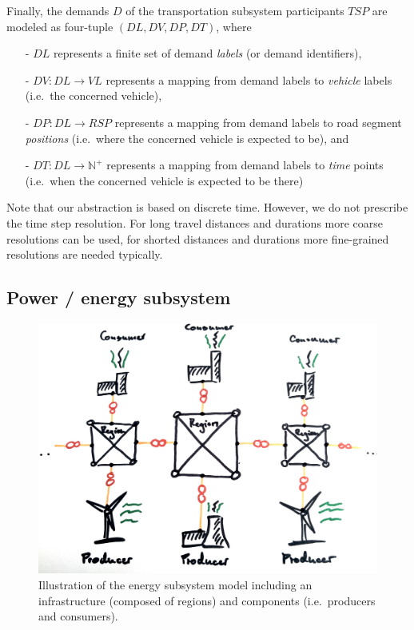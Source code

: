 Finally, the demands $D$ of the transportation subsystem participants $TSP$ are modeled as four-tuple $(DL, DV, DP, DT)$, where
\begin{itemize}
	\item[-] $DL$ represents a finite set of demand \textit{labels} (or demand identifiers),
	\item[-] $DV: DL \rightarrow VL$ represents a mapping from demand labels to \textit{vehicle} labels (i.e.\ the concerned vehicle),
	\item[-] $DP: DL \rightarrow RSP$ represents a mapping from demand labels to road segment \textit{positions} (i.e.\ where the concerned vehicle is expected to be), and
	\item[-] $DT: DL \rightarrow \mathbb{N}^+$ represents a mapping from demand labels to \textit{time} points (i.e.\ when the concerned vehicle is expected to be there)
\end{itemize}
Note that our abstraction is based on discrete time. However, we do not prescribe the time step resolution. For long travel distances and durations more coarse resolutions can be used, for shorted distances and durations more fine-grained resolutions are needed typically.

\subsection{Power / energy subsystem}
\label{energy_system}

\begin{figure}[h]
	\includegraphics[width=\columnwidth]{./gfx/energy_system.jpg}
	\caption{Illustration of the energy subsystem model including an infrastructure (composed of regions) and components (i.e.\ producers and consumers).}
\end{figure}

